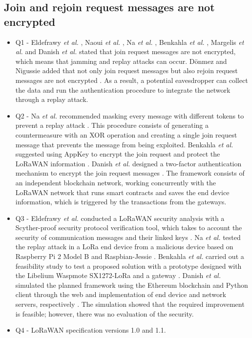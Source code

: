 \documentclass[manuscript,screen,review=false]{acmart}
\begin{document}
\subsection{Join and rejoin request messages are not encrypted}
\begin{itemize}
\item Q1 - Eldefrawy {\it et al.} \cite{01_formal_security_analysis_LoRaWAN}, Naoui {\it et al.} \cite{35_third_party_key_management}, Na {\it et al.} \cite{44_countermeasure_replay_attack}, Benkahla {\it et al.} \cite{49_analysis_lorawan_duty_cycle}, Margelis {\it et al.} \cite{70_low_throughput_networks_IoT} and Danish {\it et al.} \cite{107_blockchain_authentication} stated that join request messages are not encrypted, which means that jamming and replay attacks can occur. D\"onmez and Nigussie added that not only join request messages but also rejoin request messages are not encrypted \cite{02_security_procedure_LoRaWANv1.1}. As a result, a potential eavesdropper can collect the data and run the authentication procedure to integrate the network through a replay attack.

\item Q2 - Na {\it et al.} recommended masking every message with different tokens to prevent a replay attack \cite{44_countermeasure_replay_attack}. This procedure consists of generating a countermeasure with an XOR operation and creating a single join request message that prevents the message from being exploited. Benkahla {\it et al.} suggested using AppKey to encrypt the join request and protect the LoRaWAN information \cite{49_analysis_lorawan_duty_cycle}. Danish {\it et al.} designed a two-factor authentication mechanism to encrypt the join request messages \cite{107_blockchain_authentication}. The framework consists of an independent blockchain network, working concurrently with the LoRaWAN network that runs smart contracts and saves the end device information, which is triggered by the transactions from the gateways.

\item Q3 - Eldefrawy {\it et al.} conducted a LoRaWAN security analysis with a Scyther-proof security protocol verification tool, which takes to account the security of communication messages and their linked keys \cite{01_formal_security_analysis_LoRaWAN}. Na {\it et al.} tested the replay attack in a LoRa end device from a malicious device based on Raspberry Pi 2 Model B and Raspbian-Jessie \cite{44_countermeasure_replay_attack}. Benkahla {\it et al.} carried out a feasibility study to test a proposed solution with a prototype designed with the Libelium Waspmote SX1272-LoRa and a gateway \cite{49_analysis_lorawan_duty_cycle}. Danish {\it et al.} simulated the planned framework using the Ethereum blockchain and Python client through the web and implementation of end device and network servers, respectively \cite{107_blockchain_authentication}. The simulation showed that the required improvement is feasible; however, there was no evaluation of the security.

\item Q4 - LoRaWAN specification versions 1.0 and 1.1.
\end{itemize}
\end{document}
